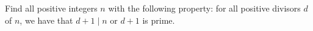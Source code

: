 Find all positive integers $n$ with the following property: for all positive divisors $d$ of $n$, we have that $d + 1 \mid n$ or $d + 1$ is prime.
